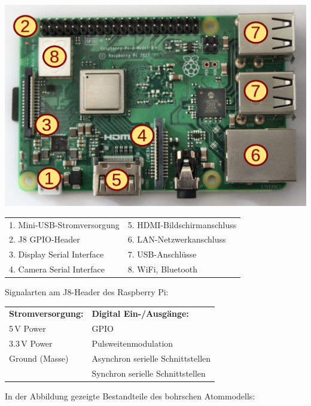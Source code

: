 \begin{center}
    \includegraphics[width=.5\textwidth]{2-hardwaredesign/img/raspberry_anschluesse}
\end{center}

\begin{tabularx}{\textwidth}{XX}
        1. Mini-USB-Stromversorgung     &   5. HDMI-Bildschirmanschluss     \\
        2. J8 GPIO-Header               &   6. LAN-Netzwerkanschluss        \\
        3. Display Serial Interface     &   7. USB-Anschlüsse               \\
        4. Camera Serial Interface      &   8. WiFi, Bluetooth              \\
\end{tabularx}

\bigskip
\teilaufgabe
Signalarten am J8-Header des Raspberry Pi:

\medskip

\begin{tabularx}{\textwidth}{XX}
    \textbf{Stromversorgung:}   &   \textbf{Digital Ein-/Ausgänge:}     \\
    5\,V Power                  &   GPIO                                \\
    3.3\,V Power                &   Pulsweitenmodulation                \\
    Ground (Masse)              &   Asynchron serielle Schnittstellen   \\
                                &   Synchron serielle Schnittstellen    \\
\end{tabularx}

\teilaufgabe
In der Abbildung gezeigte Bestandteile des bohrschen Atommodells:

